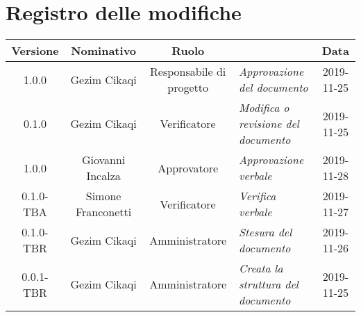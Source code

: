 \section*{Registro delle modifiche}
\renewcommand{\arraystretch}{1.8}

  \begin{longtable}{|c|c|c|p{3.8cm}|c|}
    \hline

    \rowcolor{header}
    \textbf{Versione} & \textbf{Nominativo} & \textbf{Ruolo} & \centering{\textbf{Descrizione}} & \textbf{Data}\\

    \hline

	1.0.0 & Gezim Cikaqi & Responsabile di progetto & \small{\textit{Approvazione del documento}} & 2019-11-25\\

	\hline
    \hline

	0.1.0 & Gezim Cikaqi & Verificatore & \small{\textit{Modifica o revisione del documento}} & 2019-11-25\\

	\hline
    \hline

    1.0.0 & Giovanni Incalza & Approvatore & \small{\textit{Approvazione verbale}} & 2019-11-28\\
    0.1.0-TBA & Simone Franconetti & Verificatore & \small{\textit{Verifica verbale}} & 2019-11-27\\
    0.1.0-TBR & Gezim Cikaqi & Amministratore & \small{\textit{Stesura del documento}} & 2019-11-26\\
    0.0.1-TBR & Gezim Cikaqi & Amministratore & \small{\textit{Creata la struttura del documento}} & 2019-11-25\\

    \hline

  \end{longtable}
